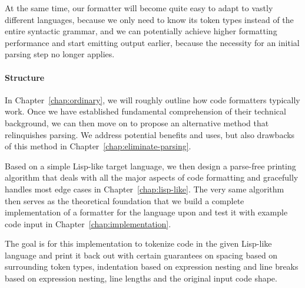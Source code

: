 At the same time, our formatter will become quite easy to adapt to vastly different languages,
because we only need to know its token types instead of the entire syntactic grammar,
and we can potentially achieve higher formatting performance and start emitting output earlier,
because the necessity for an initial parsing step no longer applies.

\paragraph{Structure}
In Chapter~\ref{chap:ordinary}, we will roughly outline how code formatters typically work.
Once we have established fundamental comprehension of their technical background,
we can then move on to propose an alternative method that relinquishes parsing.
We address potential benefits and uses,
but also drawbacks of this method in Chapter~\ref{chap:eliminate-parsing}.

Based on a simple Lisp-like target language,
we then design a parse-free printing algorithm
that deals with all the major aspects of code formatting
and gracefully handles most edge cases
in Chapter~\ref{chap:lisp-like}.
The very same algorithm then serves as the theoretical foundation
that we build a complete implementation of a formatter
for the language upon and test it with example code input
in Chapter~\ref{chap:implementation}.

The goal is for this implementation to tokenize code in the given Lisp-like language
and print it back out with certain guarantees on
spacing based on surrounding token types,
indentation based on expression nesting and
line breaks based on expression nesting, line lengths and the original input code shape.
